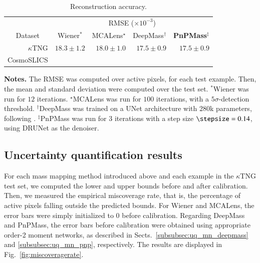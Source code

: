 \documentclass{aa}
\begin{document}
\begin{table}
    \caption{Reconstruction accuracy.}             
    \label{table:rmse}
    \centering
    \setlength{\tabcolsep}{4pt}
    \vspace{-5pt}
    \small
    \begin{centering}
    \small
    \begin{tabular}{ r | r r r r }
        \hline\hline
        & \multicolumn{4}{c}{RMSE ($\times 10^{-3}$)} \\
        \multicolumn{1}{c|}{Dataset} & \multicolumn{1}{c}{Wiener$^\ast$} & \multicolumn{1}{c}{MCALens$^\star$} & \multicolumn{1}{c}{DeepMass$^\dagger$} & \multicolumn{1}{c}{\textbf{PnPMass}$^\ddagger$} \\
        \hline
        $\kappa$TNG & $18.3 \pm 1.2$ & $18.0 \pm 1.0$ & $\mathbf{17.5 \pm 0.9}$ & $\mathbf{17.5 \pm 0.9}$ \\
        CosmoSLICS &  \\
        \hline
    \end{tabular}
    \end{centering}
    \begin{minipage}{\linewidth}
        \vspace{5pt}
        \footnotesize
        \textbf{Notes.} 
        The RMSE was computed over active pixels, for each test example. Then, the mean and standard deviation were computed over the test set. $^\ast$Wiener was run for $12$ iterations. $^\star$MCALens was run for $100$ iterations, with a $5\sigma$-detection threshold. $^\dagger$DeepMass was trained on a UNet architecture with $280$k parameters, following \citet{Jeffrey2020}. $^\ddagger$PnPMass was run for $3$ iterations with a step size $\stepsize = 0.14$, using DRUNet as the denoiser. 
    \end{minipage}
\end{table}

\subsection{Uncertainty quantification results}

For each mass mapping method introduced above and each example in the $\kappa$TNG test set, we computed the lower and upper bounds before and after calibration. Then, we measured the empirical miscoverage rate, that is, the percentage of active pixels falling outside the predicted bounds.
For Wiener and MCALens, the error bars were simply initialized to $0$ before calibration. Regarding DeepMass and PnPMass, the error bars before calibration were obtained using appropriate order-2 moment networks, as described in Sects.~\ref{subsubsec:uq_mn_deepmass} and \ref{subsubsec:uq_mn_pnp}, respectively.
The results are displayed in Fig.~\ref{fig:miscoveragerate}.
\end{document}
